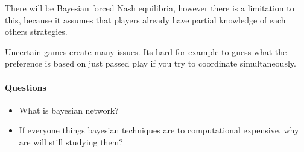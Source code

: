 \documentclass{article}
\begin{document}
There will be Bayesian forced Nash equilibria, however there is
a limitation to this, because it assumes that players already
have partial knowledge of each others strategies.

Uncertain games create many issues. Its hard for example
to guess what the preference is based on just passed play
if you try to coordinate simultaneously.
 
\paragraph{Questions}
\begin{itemize}
	\item What is bayesian network?
	\item If everyone things bayesian techniques are to computational
		expensive, why are will still studying them?
\end{itemize}
\end{document}
